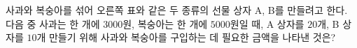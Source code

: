 \hspace*{2mm}\begin{minipage}[t]{\dimexpr\linewidth-2mm\relax}\vspace{0pt}
\noindent\begin{minipage}[t]{0.58\linewidth}\vspace{0pt}\raggedright 사과와 복숭아를 섞어 오른쪽 표와 같은 두 종류의 선물 상자 A, B를 만들려고 한다. 다음 중 사과는 한 개에 $3000$원, 복숭아는 한 개에 $5000$원일 때, A 상자를 $20$개, B 상자를 $10$개 만들기 위해 사과와 복숭아를 구입하는 데 필요한 금액을 나타낸 것은?\end{minipage}\hfill\begin{minipage}[t]{0.4\linewidth}\vspace{0pt}\centering \resizebox{\ifdim\width>\linewidth\linewidth\else\width\fi}{!}{}\end{minipage}\par

\end{minipage}
